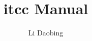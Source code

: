 \documentclass{book}
\begin{document}
\title{itcc Manual}
\author{Li Daobing}
\maketitle
\end{document}
